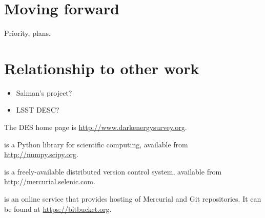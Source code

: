 \documentclass[draftmode,draftwater]{memarticle}
\begin{document}

\chapter{Moving forward}

Priority, plans.

\chapter{Relationship to other work}

\begin{itemize}
\item Salman's project?
\item LSST DESC?
\end{itemize}

\appendix

\begin{thebibliography}{99}

 The DES home page is \url{http://www.darkenergysurvey.org}.

  is a Python library for scientific computing, available from \url{http://numpy.scipy.org}.

  is a freely-available distributed
  version control system, available from
  \url{http://mercurial.selenic.com}.

  is an online service that
  provides hosting of Mercurial and Git repositories. It can be found
  at \url{https://bitbucket.org}.

\end{thebibliography}
\end{document}
